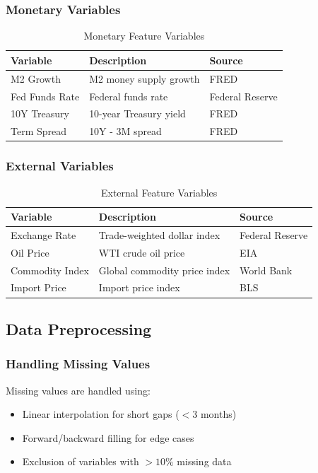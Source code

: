 \subsubsection{Monetary Variables}

\begin{table}[h]
\centering
\caption{Monetary Feature Variables}
\begin{tabular}{lll}
\toprule
Variable & Description & Source \\
\midrule
M2 Growth & M2 money supply growth & FRED \\
Fed Funds Rate & Federal funds rate & Federal Reserve \\
10Y Treasury & 10-year Treasury yield & FRED \\
Term Spread & 10Y - 3M spread & FRED \\
\bottomrule
\end{tabular}
\end{table}

\subsubsection{External Variables}

\begin{table}[h]
\centering
\caption{External Feature Variables}
\begin{tabular}{lll}
\toprule
Variable & Description & Source \\
\midrule
Exchange Rate & Trade-weighted dollar index & Federal Reserve \\
Oil Price & WTI crude oil price & EIA \\
Commodity Index & Global commodity price index & World Bank \\
Import Price & Import price index & BLS \\
\bottomrule
\end{tabular}
\end{table}

\subsection{Data Preprocessing}

\subsubsection{Handling Missing Values}

Missing values are handled using:
\begin{itemize}
    \item Linear interpolation for short gaps ($< 3$ months)
    \item Forward/backward filling for edge cases
    \item Exclusion of variables with $>10\%$ missing data
\end{itemize}


